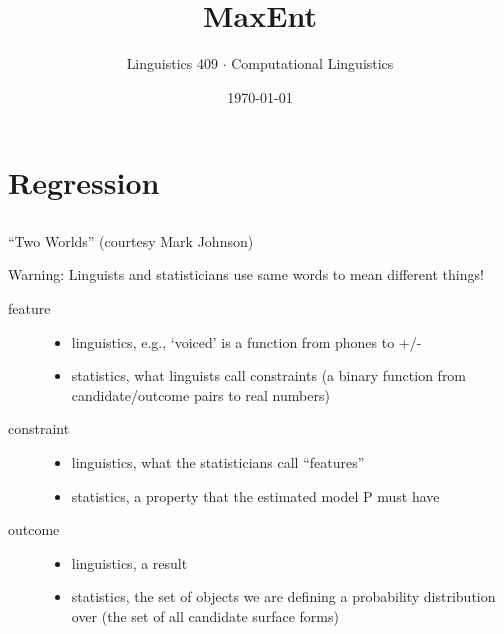 \documentclass[9pt,xcolor=pdftex,dvipsnames,table]{beamer}
\title{MaxEnt}
\subtitle{}
\author{Linguistics 409 $\cdot$ Computational Linguistics}
\institute{Rice University}
\date[]{{\small \today}}
\begin{document}

\begin{frame}

	\titlepage
\end{frame}

\section{Regression}

\subsection{}
\begin{frame}{``Two Worlds'' (courtesy Mark Johnson)}

    {\large Warning: Linguists and statisticians use same words to mean different things!}
    \vspace{.5cm}
    
	\begin{description}
		\item[feature]
			\begin{itemize}
				\item linguistics, e.g., `voiced' is a function from phones to +/-
				\item statistics, what linguists call constraints (a binary function from candidate/outcome pairs to real numbers)
			\end{itemize}

		\item[constraint]
			\begin{itemize}
				\item linguistics, what the statisticians call ``features''
				\item statistics, a property that the estimated model P must have
			\end{itemize}
			
		\item[outcome]
			\begin{itemize}
				\item linguistics, a result
				\item statistics, the set of objects we are defining a probability distribution over (the set of all candidate surface forms)
			\end{itemize}
			
	\end{description}
\end{frame}
\end{document}
